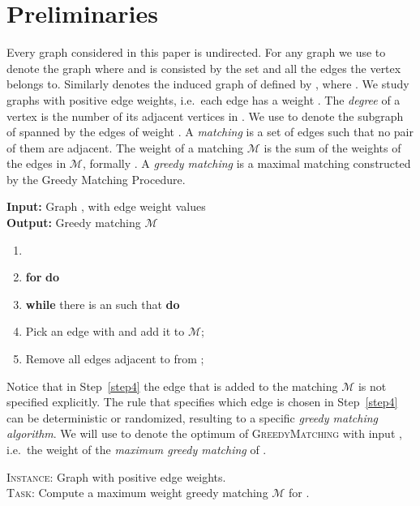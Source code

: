 \documentclass[a4paper,11pt]{article}
\newcommand{\mcal}{\ensuremath{\mathcal{M}}\xspace}
\newcommand{\greedy}{\textsc{GreedyMatching}\xspace}
\begin{document}
\section{Preliminaries}
\label{sec:pre}
Every graph considered in this paper is undirected. For any graph 
 we use  to denote the graph  where 
 and  is consisted by the set  and all the edges the 
vertex  belongs to. Similarly  denotes the induced graph of  
defined by , where . We study graphs 
with positive edge weights, i.e.~each edge  has a weight . 
The \emph{degree} of a vertex  is the number of its adjacent vertices in . 
We use  to denote the subgraph of  spanned by the edges of weight . 
A \emph{matching}  is a set of edges such that no pair of 
them are adjacent.  The weight of a matching \mcal is the sum of the weights of 
the edges in \mcal, formally . A \emph{greedy 
matching} is a maximal matching constructed by the Greedy Matching Procedure.

\begin{tcolorbox}[title=Greedy Matching Procedure]
\textbf{Input:} Graph , with  
edge weight values\\
\textbf{Output:} Greedy matching \mcal
\begin{enumerate}
\item 
\item \textbf{for}  \textbf{do}
\item \hspace*{2mm} \textbf{while} there is an  such that  
\textbf{do}
\item \hspace*{5mm} Pick an edge  with  and add it to \mcal;
\label{step4}
\item \hspace*{5mm} Remove all edges adjacent to  from ;
\end{enumerate}
\end{tcolorbox}

\medskip

Notice that in Step~\ref{step4} 
the edge that is added to the matching \mcal is not specified explicitly.
The rule that specifies which edge is chosen in Step~\ref{step4} can be 
deterministic or randomized, resulting to a specific \emph{greedy matching algorithm}. 
We will use  to denote the optimum of \greedy with input , i.e.~the weight of the \emph{maximum greedy matching} of . 

\medskip

\begin{tcolorbox}[title=\greedy]
\textsc{Instance}: Graph  with positive edge weights.\\
\textsc{Task}: Compute a maximum weight greedy matching \mcal for .
\end{tcolorbox}
\end{document}
